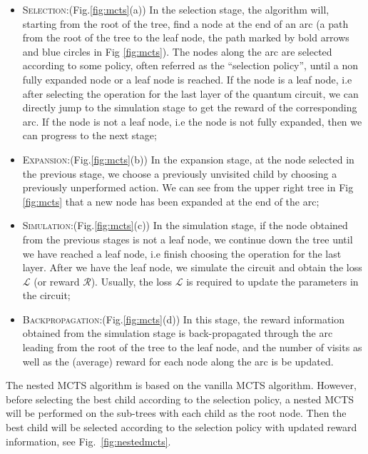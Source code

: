 \documentclass[a4paper,onecolumn,11pt]{quantumarticle}
\begin{document}
\begin{itemize}
    \item \textsc{Selection:}(Fig.\ref{fig:mcts}(a)) In the selection stage, the algorithm will, starting from the root of the tree, find a node at the end of an arc (a path from the root of the tree to the leaf node, the path marked by bold arrows and blue circles in Fig \ref{fig:mcts}). The nodes along the arc are selected according to some policy, often referred as the ``selection policy'', until a non fully expanded node or a leaf node is reached. If the node is a leaf node, i.e after selecting the operation for the last layer of the quantum circuit, we can directly jump to the simulation stage to get the reward of the corresponding arc. If the node is not a leaf node, i.e the node is not fully expanded, then we can progress to the next stage;
    \item \textsc{Expansion:}(Fig.\ref{fig:mcts}(b)) In the expansion stage, at the node selected in the previous stage, we choose a previously unvisited child by choosing a previously unperformed action. We can see from the upper right tree in Fig \ref{fig:mcts} that a new node has been expanded at the end of the arc; %
    \item \textsc{Simulation:}(Fig.\ref{fig:mcts}(c)) In the simulation stage, if the node obtained from the previous stages is not a leaf node, we continue down the tree until we have reached a leaf node, i.e finish choosing the operation for the last layer. After we have the leaf node, we simulate the circuit and obtain the loss $\mathcal{L}$ (or reward $\mathcal{R}$). Usually, the loss $\mathcal{L}$ is required to update the parameters in the circuit;
    \item \textsc{Backpropagation:}(Fig.\ref{fig:mcts}(d)) In this stage, the reward information obtained from the simulation stage is back-propagated through the arc leading from the root of the tree to the leaf node, and the number of visits as well as the (average) reward for each node along the arc is be updated.
\end{itemize}

The nested MCTS algorithm \cite{nestedmontecarlosearch} is based on the vanilla MCTS algorithm. However, before selecting the best child according to the selection policy, a nested MCTS will be performed on the sub-trees with each child as the root node. Then the best child will be selected according to the selection policy with updated reward information, see Fig.~\ref{fig:nestedmcts}.
\end{document}
